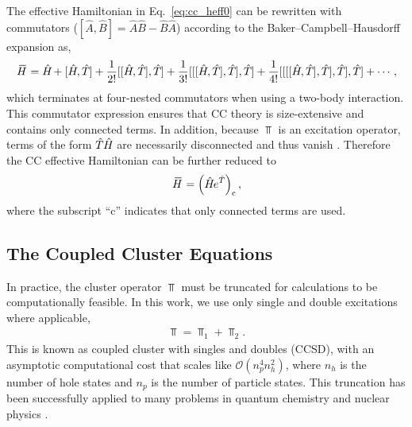 \documentclass[thesis.tex]{subfiles}
\begin{document}
The effective Hamiltonian in Eq.\ \eqref{eq:cc_heff0} can be rewritten with commutators ($[ \hat{A},\hat{B} ] = \hat{A}\hat{B} - \hat{B}\hat{A}$) according to the Baker--Campbell--Hausdorff expansion as,
\begin{align} \label{eq:bch-cc}
  \EHam = \Ham + [\Ham, \Top] + \frac{1}{2!} [[\Ham, \Top], \Top] + \frac{1}{3!} [[[\Ham, \Top], \Top], \Top] + \frac{1}{4!} [[[[\Ham, \Top], \Top], \Top], \Top] + \cdots,
\end{align}
which terminates at four-nested commutators when using a two-body  interaction.  This commutator expression ensures that CC theory is size-extensive and contains only connected terms.  In addition, because $\Top$ is an excitation operator, terms of the form $\hat{T}\hspace{-0.25pt}\hat{H}\hspace{-1pt}$ are necessarily disconnected and thus vanish \cite{SHAVITT2009}.  Therefore the CC effective Hamiltonian can be further reduced to
\begin{align} \label{eq:cc_heff1}
  \EHam = \left(\Ham e^{\Top}\right)_{\mathrm{c}},
\end{align}
where the subscript ``$\mathrm{c}$'' indicates that only connected terms are used.

\subsection{The Coupled Cluster Equations} \label{section:intro_cc_equations}

In practice, the cluster operator $\Top$ must be truncated for calculations to be computationally feasible.  In this work, we use only single and double excitations where applicable,
\begin{align*}
  \Top = \Top_{1} + \Top_{2}.
\end{align*}
This is known as coupled cluster with singles and doubles (CCSD), with an asymptotic computational cost that scales like $\mathcal{O}\left( n_{p}^{4}n_{h}^{2} \right)$, where $n_{h}$ is the number of hole states and $n_{p}$ is the number of particle states.  This truncation has been successfully applied to many problems in quantum chemistry \cite{BARTLETT2007291} and nuclear physics \cite{KOWALSKI2004132501,HAGEN2014096302}.
\end{document}
